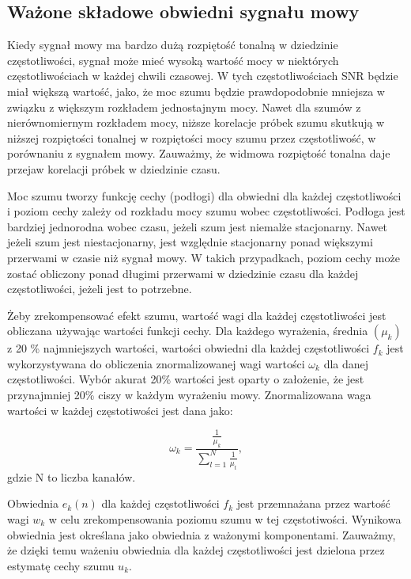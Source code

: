 \documentclass[eng,printmode]{mgr}
\begin{document}
  \subsection{Ważone składowe obwiedni sygnału mowy}
  Kiedy sygnał mowy ma bardzo dużą rozpiętość tonalną w dziedzinie częstotliwości, sygnał może mieć wysoką wartość mocy w niektórych częstotliwościach w każdej chwili czasowej. W tych częstotliwościach SNR będzie miał większą wartość, jako, że moc szumu będzie prawdopodobnie mniejsza w związku z większym rozkładem jednostajnym mocy. Nawet dla szumów z nierównomiernym rozkładem mocy, niższe korelacje próbek szumu skutkują w niższej rozpiętości tonalnej w rozpiętości mocy szumu przez częstotliwość, w porównaniu z sygnałem mowy. Zauważmy, że widmowa rozpiętość tonalna daje przejaw korelacji próbek w dziedzinie czasu. 
  
  Moc szumu tworzy funkcję cechy (podłogi) dla obwiedni dla każdej częstotliwości i poziom cechy zależy od rozkładu mocy szumu wobec częstotliwości. Podłoga jest bardziej jednorodna wobec czasu, jeżeli szum jest niemalże stacjonarny. Nawet jeżeli szum jest niestacjonarny, jest względnie stacjonarny ponad większymi przerwami w czasie niż sygnał mowy. W takich przypadkach, poziom cechy może zostać obliczony ponad długimi przerwami w dziedzinie czasu dla każdej częstotliwości, jeżeli jest to potrzebne.
  
  Żeby zrekompensować efekt szumu, wartość wagi dla każdej częstotliwości jest obliczana używając wartości funkcji cechy. Dla każdego wyrażenia, średnia $(\mu_{k})$ z 20 \% najmniejszych wartości, wartości obwiedni dla każdej częstotliwości $f_{k}$ jest wykorzystywana do obliczenia znormalizowanej wagi wartości $\omega_{k}$ dla danej częstotliwości. Wybór akurat 20\% wartości jest oparty o założenie, że jest przynajmniej 20\% ciszy w każdym wyrażeniu mowy. Znormalizowana waga wartości w każdej częstotiwości jest dana jako:
  
  \begin{equation}
  	\omega_{k} = \frac{\frac{1}{\mu_{k}}}{\sum_{l=1}^{N}	\frac{1}{\mu_{t}}},
  \end{equation}
  \hspace{10cm}gdzie N to liczba kanałów.
  
  Obwiednia $e_{k}(n)$ dla każdej częstotliwości $f_{k}$ jest przemnażana przez wartość wagi $w_{k}$ w celu zrekompensowania poziomu szumu w tej częstotiwości. Wynikowa obwiednia jest określana jako obwiednia z ważonymi komponentami. Zauważmy, że dzięki temu ważeniu obwiednia dla każdej częstotliwości jest dzielona przez estymatę cechy szumu $u_{k}$. 
  
\end{document}
